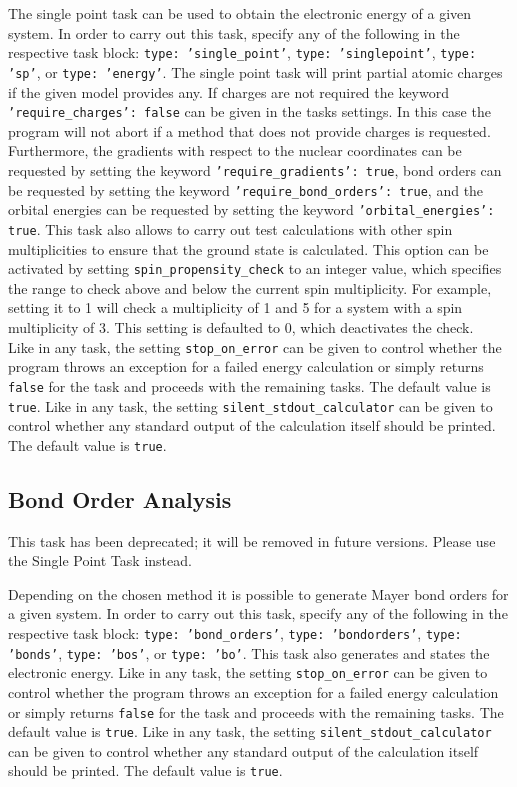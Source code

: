 \documentclass[]{tufte-book}
\begin{document}
The single point task can be used to obtain the electronic energy of a given system. In order to carry out this task,
specify any of the following in the respective task block: \texttt{type: 'single\_point'}, \texttt{type: 'singlepoint'},
\texttt{type: 'sp'}, or \texttt{type: 'energy'}. The single point task will print partial atomic charges if the given
model provides any. If charges are not required the keyword \texttt{'require\_charges': false} can be given in the tasks
settings. In this case the program will not abort if a method that does not provide charges is requested.
Furthermore, the gradients with respect to the nuclear coordinates can be requested by setting the keyword \texttt{'require\_gradients': true}, bond orders can be requested by setting the keyword \texttt{'require\_bond\_orders': true},
and the orbital energies can be requested by setting the keyword \texttt{'orbital\_energies': true}.
This task also allows to carry out test calculations with other spin multiplicities to ensure that the ground state is calculated.
This option can be activated by setting \texttt{spin\_propensity\_check} to an integer value, which specifies the range to check above and below the current spin multiplicity.
For example, setting it to 1 will check a multiplicity of 1 and 5 for a system with a spin multiplicity of 3.
This setting is defaulted to 0, which deactivates the check.\\
Like in any task, the setting \texttt{stop\_on\_error} can be given to control whether the program throws an exception for a failed energy calculation or simply returns \texttt{false} for the task and proceeds with the remaining tasks. The default value is \texttt{true}.
Like in any task, the setting \texttt{silent\_stdout\_calculator} can be given to control whether any standard output of the calculation itself should be printed. The default value is \texttt{true}.

\subsection{Bond Order Analysis}

This task has been deprecated; it will be removed in future versions. Please use the Single Point Task instead.

Depending on the chosen method it is possible to generate Mayer bond orders for a given system. In order to carry out this task,
specify any of the following in the respective task block: \texttt{type: 'bond\_orders'}, \texttt{type: 'bondorders'},
\texttt{type: 'bonds'}, \texttt{type: 'bos'}, or \texttt{type: 'bo'}.
This task also generates and states the electronic energy.
Like in any task, the setting \texttt{stop\_on\_error} can be given to control whether the program throws an exception for a failed energy calculation or simply returns \texttt{false} for the task and proceeds with the remaining tasks. The default value is \texttt{true}.
Like in any task, the setting \texttt{silent\_stdout\_calculator} can be given to control whether any standard output of the calculation itself should be printed. The default value is \texttt{true}.
\end{document}
